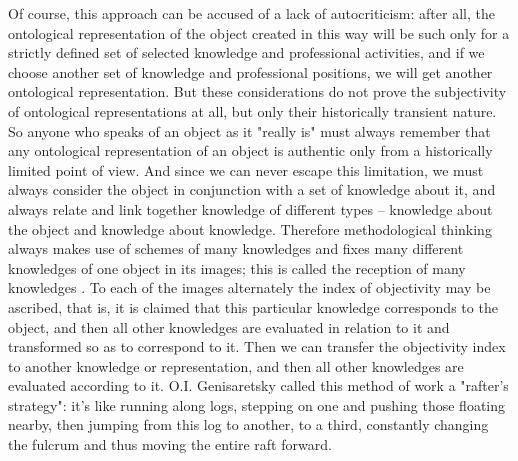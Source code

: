 \documentclass[11pt,a4paper]{article}
\begin{document}
\begin{itemize}
  Of course, this approach can be accused of a lack of autocriticism: after
  all, the ontological representation of the object created in this way will
  be such only for a strictly defined set of selected knowledge and
  professional activities, and if we choose another set of knowledge and
  professional positions, we will get another ontological representation. But
  these considerations do not prove the subjectivity of ontological
  representations at all, but only their historically transient nature. So
  anyone who speaks of an object as it "really is" must always remember that
  any ontological representation of an object is authentic only from a
  historically limited point of view. And since we can never escape this
  limitation, we must always consider the object in conjunction with a set of
  knowledge about it, and always relate and link together knowledge of
  different types – knowledge about the object and knowledge about
  knowledge. Therefore methodological thinking always makes use of schemes of
  many knowledges and fixes many different knowledges of one object in its
  images; this is called the reception of many knowledges
  \cite{Shchedrovitsky1964a, Shchedrovitsky1971i}.  To each of the images
  alternately the index of objectivity may be ascribed, that is, it is claimed
  that this particular knowledge corresponds to the object, and then all other
  knowledges are evaluated in relation to it and transformed so as to
  correspond to it. Then we can transfer the objectivity index to another
  knowledge or representation, and then all other knowledges are evaluated
  according to it. O.I. Genisaretsky called this method of work a "rafter's
  strategy": it's like running along logs, stepping on one and pushing those
  floating nearby, then jumping from this log to another, to a third,
  constantly changing the fulcrum and thus moving the entire raft forward.
  

\end{itemize}
\end{document}
